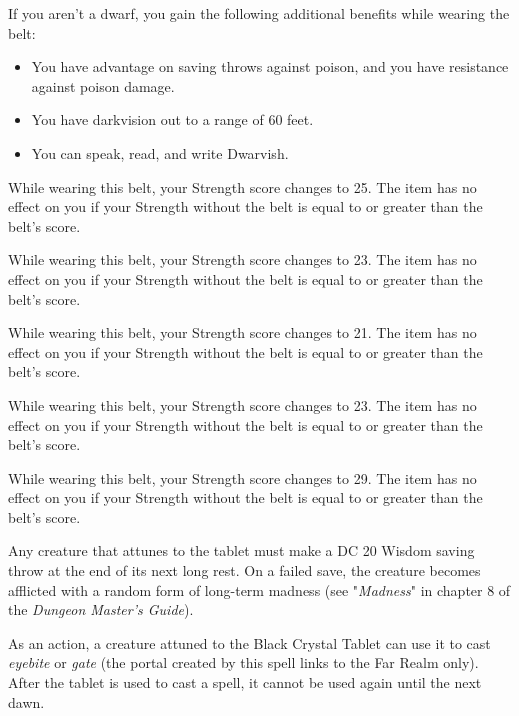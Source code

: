 \documentclass[10pt,a4paper,twoside,bg=print,twocolumn,openany,nodeprecatedcode]{dndbook}
\begin{document}
If you aren't a dwarf, you gain the following additional benefits while wearing the belt:


\begin{itemize}
\item You have advantage on saving throws against poison, and you have resistance against poison damage.
\item You have darkvision out to a range of 60 feet.
\item You can speak, read, and write Dwarvish.
\end{itemize}

While wearing this belt, your Strength score changes to 25. The item has no effect on you if your Strength without the belt is equal to or greater than the belt's score.

While wearing this belt, your Strength score changes to 23. The item has no effect on you if your Strength without the belt is equal to or greater than the belt's score.

While wearing this belt, your Strength score changes to 21. The item has no effect on you if your Strength without the belt is equal to or greater than the belt's score.

While wearing this belt, your Strength score changes to 23. The item has no effect on you if your Strength without the belt is equal to or greater than the belt's score.

While wearing this belt, your Strength score changes to 29. The item has no effect on you if your Strength without the belt is equal to or greater than the belt's score.

Any creature that attunes to the tablet must make a DC 20 Wisdom saving throw at the end of its next long rest. On a failed save, the creature becomes afflicted with a random form of long-term madness (see "\textit{Madness}" in chapter 8 of the \textit{Dungeon Master's Guide}).

As an action, a creature attuned to the Black Crystal Tablet can use it to cast \textit{eyebite} or \textit{gate} (the portal created by this spell links to the Far Realm only). After the tablet is used to cast a spell, it cannot be used again until the next dawn.
\end{document}
